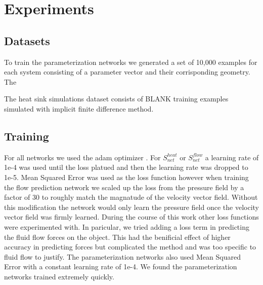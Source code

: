 \documentclass{article} %
\begin{document}
\section{Experiments}


\subsection{Datasets}

To train the parameterization networks we generated a set of 10,000 examples for each system consisting of a parameter vector and their corrisponding geometry. The 

The heat sink simulations dataset consists of BLANK training examples simulated with implicit finite difference method.

\subsection{Training}

For all networks we used the adam optimizer \cite{kingma2014adam}. For $S^{heat}_{net}$ or $S^{flow}_{net}$ a learning rate of 1e-4 was used until the loss platued and then the learning rate was dropped to 1e-5. Mean Squared Error was used as the loss function however when training the flow prediction network we scaled up the loss from the pressure field by a factor of 30 to roughly match the magnatude of the velocity vector field. Without this modification the network would only learn the pressure field once the velocity vector field was firmly learned. During the course of this work other loss functions were experimented with. In paricular, we tried adding a loss term in predicting the fluid flow forces on the object. This had the benificial effect of higher accuracy in predicting forces but complicated the method and was too specific to fluid flow to justify. The parameterization networks also used Mean Squared Error with a constant learning rate of 1e-4. We found the parameterization networks trained extremely quickly.
\end{document}
